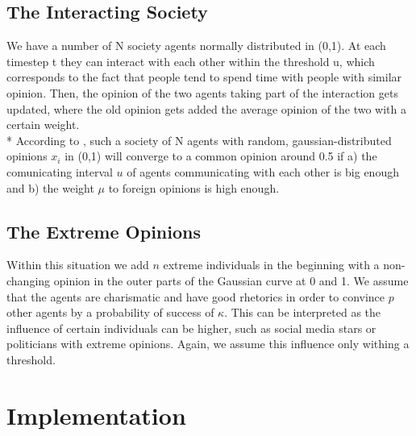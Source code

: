 \documentclass[11pt]{article}
\begin{document}
\subsection{The Interacting Society}
We have a number of N society agents normally distributed in (0,1). At each timestep t they can interact with each other within the threshold u, which corresponds to the fact that people tend to spend time with people with similar opinion. Then, the opinion of the two agents taking part of the interaction gets updated, where the old opinion gets added the average opinion of the two with a certain weight. \\*
According to \cite{Minor}, such a society of N agents with random, gaussian-distributed opinions $x_i$ in (0,1) will converge to a common opinion around 0.5 if a) the comunicating interval $u$ of agents communicating with each other is big enough and b) the weight $\mu$ to foreign opinions is high enough.

\subsection{The Extreme Opinions}
Within this situation we add $n$ extreme individuals in the beginning with a non-changing opinion in the outer parts of the Gaussian curve at 0 and 1. We assume that the agents are charismatic and have good rhetorics in order to convince $p$ other agents by a probability of success of $\kappa$. This can be interpreted as the influence of certain individuals can be higher, such as social media stars or politicians with extreme opinions. Again, we assume this influence only withing a threshold.

\section{Implementation}
\end{document}
